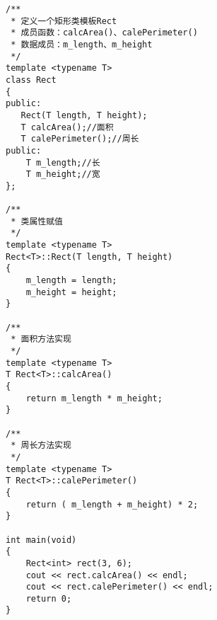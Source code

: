 \documentclass{article}
\begin{document}
\begin{CJK}{UTF8}{gbsn}
\begin{verbatim}
/**
 * 定义一个矩形类模板Rect
 * 成员函数：calcArea()、calePerimeter()
 * 数据成员：m_length、m_height
 */
template <typename T>
class Rect
{
public:
   Rect(T length, T height);
   T calcArea();//面积
   T calePerimeter();//周长
public:
	T m_length;//长
	T m_height;//宽
};

/**
 * 类属性赋值
 */
template <typename T>
Rect<T>::Rect(T length, T height)
{
	m_length = length;
	m_height = height;
}

/**
 * 面积方法实现
 */
template <typename T>
T Rect<T>::calcArea()
{
	return m_length * m_height;
}

/**
 * 周长方法实现
 */
template <typename T>
T Rect<T>::calePerimeter()
{
	return ( m_length + m_height) * 2;
}

int main(void)
{
	Rect<int> rect(3, 6);
	cout << rect.calcArea() << endl;
	cout << rect.calePerimeter() << endl;
	return 0;
}
\end{verbatim}
\end{CJK}
\end{document}
